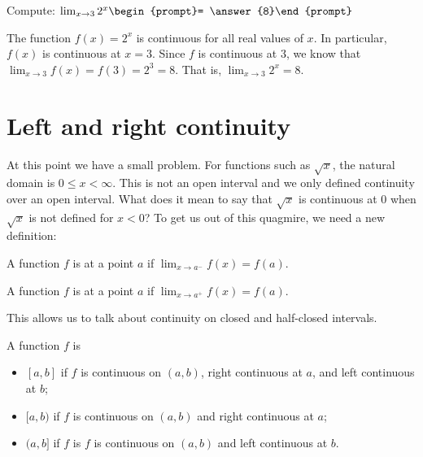 \documentclass{ximera}
\begin{document}
\begin{question}
  Compute:
  $\lim_{x\to 3} 2^{x}\begin{prompt}= \answer{8}\end{prompt}$
  \begin{feedback}
    The function $f(x)=  2^x$ is continuous
 for all real values of
    $x$.  In particular, $f(x)$ is continuous at $x=3$.  Since $f$
    is continuous at $3$, we know that $\lim_{x\to 3} f(x) = f(3)=2^3=8$.
    That is, $\lim_{x\to 3} 2^x= 8$.
  \end{feedback}  
\end{question}
\section{Left and right continuity}


At this point we have a small problem.  For functions such as
$\sqrt{x}$, the natural domain is $0\leq x <\infty$.  This is not an
open interval and we only defined continuity over an open interval.  What does it mean to say that $\sqrt{x}$ is continuous
at $0$ when $\sqrt{x}$ is not defined for $x<0$? To get us out of this
quagmire, we need a new definition:

\begin{definition}
  A function $f$ is  at a point $a$ if
  $\lim_{x\to a^-} f(x) = f(a)$.

  A function $f$ is  at a point $a$ if
  $\lim_{x\to a^+} f(x) = f(a)$.
\end{definition}

 This allows us to talk about continuity on closed and half-closed intervals.


\begin{definition}
  A function $f$ is
  \begin{itemize}
    \item {} $[a,b]$ if $f$ is
      continuous on $(a,b)$, right continuous at $a$, and left
      continuous at $b$;
    \item {} $[a,b)$ if $f$ is
      continuous on $(a,b)$ and right continuous at $a$;
    \item {} $(a,b]$ if $f$ is
      $f$ is continuous on $(a,b)$ and left continuous at $b$.
  \end{itemize}
\end{definition}
\end{document}
